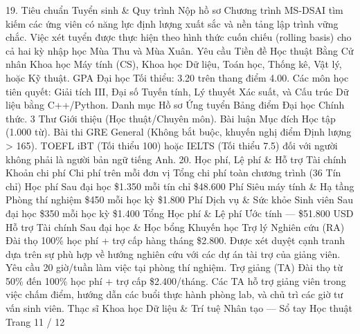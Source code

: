 19. Tiêu chuẩn Tuyển sinh \& Quy trình Nộp hồ sơ
Chương trình MS-DSAI tìm kiếm các ứng viên có năng lực định lượng xuất sắc và nền tảng lập trình vững chắc. Việc xét tuyển được thực hiện theo hình thức cuốn chiếu (rolling basis) cho cả hai kỳ nhập học Mùa Thu và Mùa Xuân.
Yêu cầu Tiền đề Học thuật
Bằng Cử nhân Khoa học Máy tính (CS), Khoa học Dữ liệu, Toán học, Thống kê,
Vật lý, hoặc Kỹ thuật.
GPA Đại học Tối thiểu: 3.20 trên thang điểm 4.00.
Các môn học tiên quyết: Giải tích III, Đại số Tuyến tính,
Lý thuyết Xác suất, và Cấu trúc Dữ liệu bằng C++/Python.
Danh mục Hồ sơ Ứng tuyển
Bảng điểm Đại học Chính thức.
3 Thư Giới thiệu (Học thuật/Chuyên môn).
Bài luận Mục đích Học tập (1.000 từ).
Bài thi GRE General (Không bắt buộc, khuyến nghị
điểm Định lượng > 165).
TOEFL iBT (Tối thiểu 100) hoặc IELTS (Tối thiểu 7.5) đối với người không phải
là người bản ngữ tiếng Anh.
20. Học phí, Lệ phí \& Hỗ trợ Tài chính
Khoản chi phí
Chi phí trên mỗi đơn vị
Tổng chi phí toàn chương trình (36 Tín chỉ)
Học phí Sau đại học
\$1.350 mỗi tín chỉ
\$48.600
Phí Siêu máy tính \& Hạ tầng Phòng thí nghiệm
\$450 mỗi học kỳ
\$1.800
Phí Dịch vụ \& Sức khỏe Sinh viên Sau đại học
\$350 mỗi học kỳ
\$1.400
Tổng Học phí \& Lệ phí Ước tính
—
\$51.800 USD
Hỗ trợ Tài chính Sau đại học \& Học bổng Khuyến học
Trợ lý Nghiên cứu (RA)
Đài thọ 100\% học phí + trợ cấp hàng tháng \$2.800.
Được xét duyệt cạnh tranh dựa trên sự phù hợp về hướng nghiên cứu với
các dự án tài trợ của giảng viên. Yêu cầu 20 giờ/tuần làm việc tại phòng thí nghiệm.
Trợ giảng (TA)
Đài thọ từ 50\% đến 100\% học phí + trợ cấp \$2.400/tháng.
Các TA hỗ trợ giảng viên trong việc chấm điểm, hướng dẫn các buổi
thực hành phòng lab, và chủ trì các giờ tư vấn sinh viên.
Thạc sĩ Khoa học Dữ liệu \& Trí tuệ Nhân tạo — Sổ tay Học thuật
Trang 11 / 12

